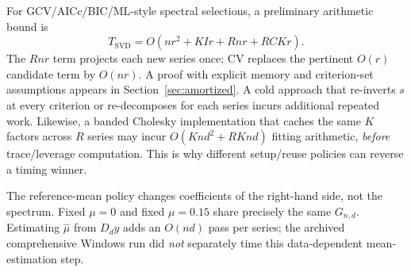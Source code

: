 For GCV/AICc/BIC/ML-style spectral selections, a preliminary arithmetic bound is
\begin{equation}\label{eq:cost}
T_{\mathrm{SVD}}=O(nr^2+KIr+Rnr+RCKr).
\end{equation}
The $Rnr$ term projects each new series once; CV replaces the pertinent $O(r)$ candidate term by $O(nr)$. A proof with explicit memory and criterion-set assumptions appears in Section~\ref{sec:amortized}. A cold approach that re-inverts $s$ at every criterion or re-decomposes for each series incurs additional repeated work. Likewise, a banded Cholesky implementation that caches the same $K$ factors across $R$ series may incur $O(Knd^2+RKnd)$ fitting arithmetic, \emph{before} trace/leverage computation. This is why different setup/reuse policies can reverse a timing winner.

The reference-mean policy changes coefficients of the right-hand side, not the spectrum. Fixed $\mu=0$ and fixed $\mu=0.15$ share precisely the same $G_{n,d}$. Estimating $\widehat\mu$ from $D_dy$ adds an $O(nd)$ pass per series; the archived comprehensive Windows run did \emph{not} separately time this data-dependent mean-estimation step.

